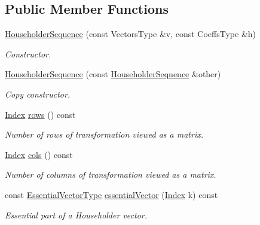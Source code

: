 \subsection*{Public Member Functions}
\begin{DoxyCompactItemize}
\item 
\mbox{\hyperlink{class_eigen_1_1_householder_sequence_af6aeede87ed8dac452f4fa8b4f45c3f2}{Householder\+Sequence}} (const Vectors\+Type \&v, const Coeffs\+Type \&h)
\begin{DoxyCompactList}\small\item\em Constructor. \end{DoxyCompactList}\item 
\mbox{\label{class_eigen_1_1_householder_sequence_aa4b1b93fff4d5c79342974d9d2a9eec8}} 
\mbox{\hyperlink{class_eigen_1_1_householder_sequence_aa4b1b93fff4d5c79342974d9d2a9eec8}{Householder\+Sequence}} (const \mbox{\hyperlink{class_eigen_1_1_householder_sequence}{Householder\+Sequence}} \&other)
\begin{DoxyCompactList}\small\item\em Copy constructor. \end{DoxyCompactList}\item 
\mbox{\hyperlink{struct_eigen_1_1_eigen_base_a554f30542cc2316add4b1ea0a492ff02}{Index}} \mbox{\hyperlink{class_eigen_1_1_householder_sequence_a6eaafe2460930d1f4aa67d6e577b71f0}{rows}} () const
\begin{DoxyCompactList}\small\item\em Number of rows of transformation viewed as a matrix. \end{DoxyCompactList}\item 
\mbox{\hyperlink{struct_eigen_1_1_eigen_base_a554f30542cc2316add4b1ea0a492ff02}{Index}} \mbox{\hyperlink{class_eigen_1_1_householder_sequence_adcdcdd92a77810ce4bdd2b1282fe6a75}{cols}} () const
\begin{DoxyCompactList}\small\item\em Number of columns of transformation viewed as a matrix. \end{DoxyCompactList}\item 
const \mbox{\hyperlink{class_eigen_1_1_block}{Essential\+Vector\+Type}} \mbox{\hyperlink{class_eigen_1_1_householder_sequence_ac91cf37b0cbea9e504c89e021fd289ba}{essential\+Vector}} (\mbox{\hyperlink{struct_eigen_1_1_eigen_base_a554f30542cc2316add4b1ea0a492ff02}{Index}} k) const
\begin{DoxyCompactList}\small\item\em Essential part of a Householder vector. \end{DoxyCompactList}\item 

\end{DoxyCompactItemize}

